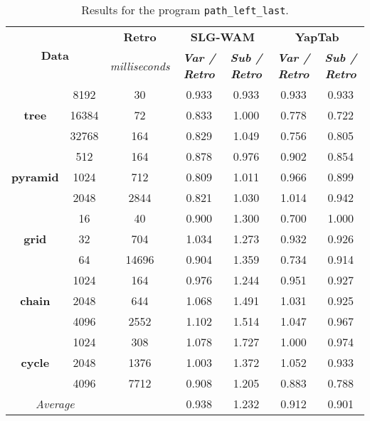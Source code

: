 \begin{table}[ht]
\centering
\footnotesize{
  \begin{tabular}{cc|c|cc|cc}
   \hline
    \hline
    \multicolumn{2}{c|}{\multirow{2}{*}{\small{\textbf{Data}}}} & \textbf{\small{Retro}} & \multicolumn{2}{c|}{\small{\textbf{SLG-WAM}}} & \multicolumn{2}{c}{\small{\textbf{YapTab}}} \\
     \multicolumn{2}{c|}{} & \scriptsize{\textit{milliseconds}} & \textbf{\textit{\scriptsize{Var / Retro}}} & \textbf{\textit{\scriptsize{Sub / Retro}}} & \textbf{\textit{\scriptsize{Var / Retro}}} & \textbf{\textit{\scriptsize{Sub / Retro}}} \\
   \hline
   \hline

\multirow{3}{*}{\textbf{tree}} &  8192 &  30 &  0.933  &  0.933  &  0.933 & 0.933 \\
&  16384 &  72 &  0.833  &  1.000  &  0.778 & 0.722 \\
&  32768 &  164 &  0.829  &  1.049  &  0.756 & 0.805 \\
\hline
\multirow{3}{*}{\textbf{pyramid}} &  512 &  164 &  0.878  &  0.976  &  0.902 & 0.854 \\
&  1024 &  712 &  0.809  &  1.011  &  0.966 & 0.899 \\
&  2048 &  2844 &  0.821  &  1.030  &  1.014 & 0.942 \\
\hline
\multirow{3}{*}{\textbf{grid}} &  16 &  40 &  0.900  &  1.300  &  0.700 & 1.000 \\
&  32 &  704 &  1.034  &  1.273  &  0.932 & 0.926 \\
&  64 &  14696 &  0.904  &  1.359  &  0.734 & 0.914 \\
\hline
\multirow{3}{*}{\textbf{chain}} &  1024 &  164 &  0.976  &  1.244  &  0.951 & 0.927 \\
&  2048 &  644 &  1.068  &  1.491  &  1.031 & 0.925 \\
&  4096 &  2552 &  1.102  &  1.514  &  1.047 & 0.967 \\
\hline
\multirow{3}{*}{\textbf{cycle}} &  1024 &  308 &  1.078  &  1.727  &  1.000 & 0.974 \\
&  2048 &  1376 &  1.003  &  1.372  &  1.052 & 0.933 \\
&  4096 &  7712 &  0.908  &  1.205  &  0.883 & 0.788 \\
\hline
\hline
\multicolumn{2}{c}{\textit{Average}} & & 0.938 & 1.232 & 0.912 & 0.901 \\ 
\hline
\hline
\end{tabular}
}
\caption{Results for the program \texttt{path\_left\_last}.}
\label{tbl:prefix_path_left_last}
\end{table}

